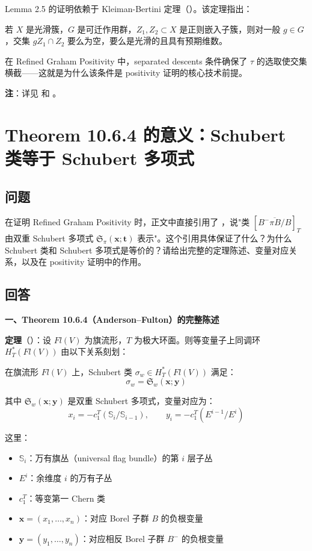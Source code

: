 Lemma 2.5 的证明依赖于 Kleiman-Bertini 定理（\cite[Section 19.3]{anderson2023}）。该定理指出：

若 $X$ 是光滑簇，$G$ 是可迁作用群，$Z_1, Z_2 \subset X$ 是正则嵌入子簇，则对一般 $g \in G$，交集 $gZ_1 \cap Z_2$ 要么为空，要么是光滑的且具有预期维数。

在 Refined Graham Positivity 中，separated descents 条件确保了 $\tau$ 的选取使交集横截——这就是为什么该条件是 positivity 证明的核心技术前提。

\textbf{注}：详见 \cite[Section 2.5, Corollary 2.4]{GX2025} 和 \cite[Section 19.3]{anderson2023}。

\section{Theorem 10.6.4 的意义：Schubert 类等于 Schubert 多项式}\label{sec:qa-Theorem1064}
\subsection{问题}
在证明 Refined Graham Positivity 时，正文中直接引用了 \cite[Theororem 10.6.4]{anderson2023}，说"类 $[\overline{B^-\pi B/B}]_T$ 由双重 Schubert 多项式 $\mathfrak{S}_\pi(\mathbf{x}; \mathbf{t})$ 表示"。这个引用具体保证了什么？为什么 Schubert 类和 Schubert 多项式是等价的？请给出完整的定理陈述、变量对应关系，以及在 positivity 证明中的作用。

\subsection{回答}

\textbf{一、Theorem 10.6.4（Anderson--Fulton）的完整陈述}

\textbf{定理}（\cite[ Theorem 10.6.4]{anderson2023}）：设 $Fl(V)$ 为旗流形，$T$ 为极大环面。则等变量子上同调环 $H_T^*(Fl(V))$ 由以下关系刻划：

在旗流形 $Fl(V)$ 上，Schubert 类 $\sigma_w \in H_T^*(Fl(V))$ 满足：
$$\sigma_w = \mathfrak{S}_w(\mathbf{x}; \mathbf{y})$$

其中 $\mathfrak{S}_w(\mathbf{x}; \mathbf{y})$ 是双重 Schubert 多项式，变量对应为：
$$x_i = -c_1^T(\mathbb{S}_i / \mathbb{S}_{i-1}), \qquad y_i = -c_1^T(E^{i-1} / E^i)$$

这里：
\begin{itemize}
\item $\mathbb{S}_i$：万有旗丛（universal flag bundle）的第 $i$ 层子丛
\item $E^i$：余维度 $i$ 的万有子丛
\item $c_1^T$：等变第一 Chern 类
\item $\mathbf{x} = (x_1, \ldots, x_n)$：对应 Borel 子群 $B$ 的负根变量
\item $\mathbf{y} = (y_1, \ldots, y_n)$：对应相反 Borel 子群 $B^-$ 的负根变量
\end{itemize}

